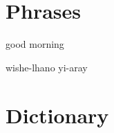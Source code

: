 \documentclass[letterpaper,twocolumn,openany,nodeprecatedcode,hidelinks]{dndbook}
\begin{document}




% 

% 

% 

% 

% 


\newpage

\section{Phrases}
good morning

wishe-lhano yi-aray




\newpage
\section{Dictionary}

\end{document}
